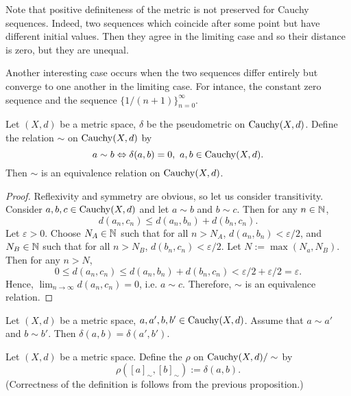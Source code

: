 \begin{remark}
  Note that positive definiteness of the metric is not preserved for Cauchy
  sequences.
  Indeed, two sequences which coincide after some point but have different
  initial values.
  Then they agree in the limiting case and so their distance is zero,
  but they are unequal.

  Another interesting case occurs when the two sequences differ entirely but
  converge to one another in the limiting case.
  For intance, the constant zero sequence and the sequence
  $\{1 / (n + 1)\}_{n = 0}^\infty$.
\end{remark}
\begin{proposition}
  Let
    $(X, d)$ be a metric space,
    $\delta$ be the pseudometric on $\mathop{\rm Cauchy}\nolimits(X, d)$.
  Define the relation $\sim$ on $\mathop{\rm Cauchy}\nolimits(X, d)$ by
  \begin{equation}
    a \sim b \Leftrightarrow \delta(a, b) = 0,\
    a, b \in \mathop{\rm Cauchy}\nolimits(X, d).
  \end{equation}
  Then $\sim$ is an equivalence relation on $\mathop{\rm Cauchy}\nolimits(X, d)$.
\end{proposition}
\begin{proof}
  Reflexivity and symmetry are obvious, so let us consider transitivity.
  Consider $a, b, c \in \mathop{\rm Cauchy}\nolimits(X, d)$ and let
  $a \sim b$ and $b \sim c$.
  Then for any $n \in \mathbb{N}$,
  \begin{equation}
    d(a_n, c_n) \leq d(a_n, b_n) + d(b_n, c_n).
  \end{equation}
  Let $\varepsilon > 0$.
  Choose
  $N_A \in \mathbb{N}$ such that for all $n > N_A$, $d(a_n, b_n) < \varepsilon / 2$, and
  $N_B \in \mathbb{N}$ such that for all $n > N_B$, $d(b_n, c_n) < \varepsilon / 2$.
  Let $N := \max(N_a, N_B)$.
  Then for any $n > N$,
  \begin{equation}
    0
    \leq d(a_n, c_n)
    \leq d(a_n, b_n) + d(b_n, c_n)
    < \varepsilon / 2 + \varepsilon / 2
    = \varepsilon.
  \end{equation}
  Hence, $\lim_{n \to \infty} d(a_n, c_n) = 0$, i.e. $a \sim c$.
  Therefore, $\sim$ is an equivalence relation.
\end{proof}
\begin{proposition}
  Let $(X, d)$ be a metric space, $a, a', b, b' \in \mathop{\rm Cauchy}\nolimits(X, d)$.
  Assume that $a \sim a'$ and $b \sim b'$.
  Then $\delta(a, b) = \delta(a', b')$.
\end{proposition}
\begin{definition}
  Let $(X, d)$ be a metric space.
  Define the $\rho$ on $\mathop{\rm Cauchy}\nolimits(X, d) / \sim$ by
  \begin{equation}
    \rho([a]_\sim, [b]_\sim) := \delta(a, b).
  \end{equation}
  (Correctness of the definition is follows from the previous proposition.)
\end{definition}
